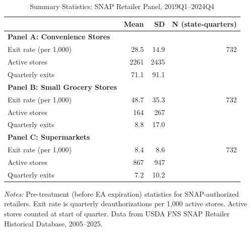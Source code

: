 \begin{table}[htbp]
\centering
\caption{Summary Statistics: SNAP Retailer Panel, 2019Q1--2024Q4}
\label{tab:sumstats}
\begin{tabular}{lrrr}
\toprule
 & Mean & SD & N (state-quarters) \\
\midrule
\textbf{Panel A: Convenience Stores} & & & \\
\quad Exit rate (per 1,000) & 28.5 & 14.9 & 732 \\
\quad Active stores & 2261 & 2435 &  \\
\quad Quarterly exits & 71.1 & 91.1 &  \\
\textbf{Panel B: Small Grocery Stores} & & & \\
\quad Exit rate (per 1,000) & 48.7 & 35.3 & 732 \\
\quad Active stores & 164 & 267 &  \\
\quad Quarterly exits & 8.8 & 17.0 &  \\
\textbf{Panel C: Supermarkets} & & & \\
\quad Exit rate (per 1,000) & 8.4 & 8.6 & 732 \\
\quad Active stores & 867 & 947 &  \\
\quad Quarterly exits & 7.2 & 10.2 &  \\
\bottomrule
\end{tabular}
\begin{tablenotes}
\item \textit{Notes:} Pre-treatment (before EA expiration) statistics for SNAP-authorized retailers.
Exit rate is quarterly deauthorizations per 1,000 active stores. Active stores counted at start of quarter.
Data from USDA FNS SNAP Retailer Historical Database, 2005--2025.
\end{tablenotes}
\end{table}
